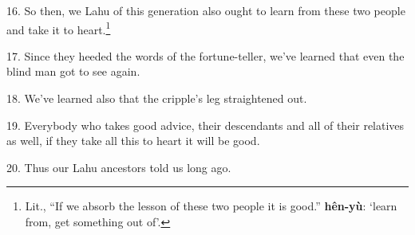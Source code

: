 16. So then, we Lahu of this generation also ought to learn from these two people
and take it to heart.\footnote{Lit., ``If we absorb the lesson of these two people it is good.'' \textbf{hên-yù}: `learn from, get something out of'.}

17. Since they heeded the words of the fortune-teller, we've learned that even
the blind man got to see again.

18. We've learned also that the cripple's leg straightened out.

19. Everybody who takes good advice, their descendants and all of their relatives
as well, if they take all this to heart it will be good.

20. Thus our Lahu ancestors told us long ago.

